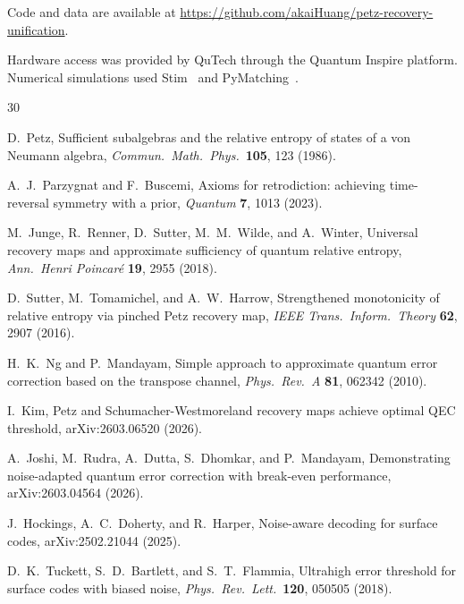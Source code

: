 \documentclass[prl,twocolumn,superscriptaddress,longbibliography]{revtex4-2}
\begin{document}
Code and data are available at \url{https://github.com/akaiHuang/petz-recovery-unification}.

\begin{acknowledgments}
Hardware access was provided by QuTech through the Quantum Inspire platform. Numerical simulations used Stim~\cite{Gidney2021} and PyMatching~\cite{Higgott2023}.
\end{acknowledgments}

\begin{thebibliography}{30}

D.~Petz,
Sufficient subalgebras and the relative entropy of states of a von Neumann algebra,
\emph{Commun.\ Math.\ Phys.}\ \textbf{105}, 123 (1986).

A.~J.~Parzygnat and F.~Buscemi,
Axioms for retrodiction: achieving time-reversal symmetry with a prior,
\emph{Quantum} \textbf{7}, 1013 (2023).

M.~Junge, R.~Renner, D.~Sutter, M.~M.~Wilde, and A.~Winter,
Universal recovery maps and approximate sufficiency of quantum relative entropy,
\emph{Ann.\ Henri Poincar\'{e}} \textbf{19}, 2955 (2018).

D.~Sutter, M.~Tomamichel, and A.~W.~Harrow,
Strengthened monotonicity of relative entropy via pinched Petz recovery map,
\emph{IEEE Trans.\ Inform.\ Theory} \textbf{62}, 2907 (2016).

H.~K.~Ng and P.~Mandayam,
Simple approach to approximate quantum error correction based on the transpose channel,
\emph{Phys.\ Rev.\ A} \textbf{81}, 062342 (2010).

I.~Kim,
Petz and Schumacher-Westmoreland recovery maps achieve optimal QEC threshold,
arXiv:2603.06520 (2026).

A.~Joshi, M.~Rudra, A.~Dutta, S.~Dhomkar, and P.~Mandayam,
Demonstrating noise-adapted quantum error correction with break-even performance,
arXiv:2603.04564 (2026).

J.~Hockings, A.~C.~Doherty, and R.~Harper,
Noise-aware decoding for surface codes,
arXiv:2502.21044 (2025).

D.~K.~Tuckett, S.~D.~Bartlett, and S.~T.~Flammia,
Ultrahigh error threshold for surface codes with biased noise,
\emph{Phys.\ Rev.\ Lett.}\ \textbf{120}, 050505 (2018).


\end{thebibliography}
\end{document}
